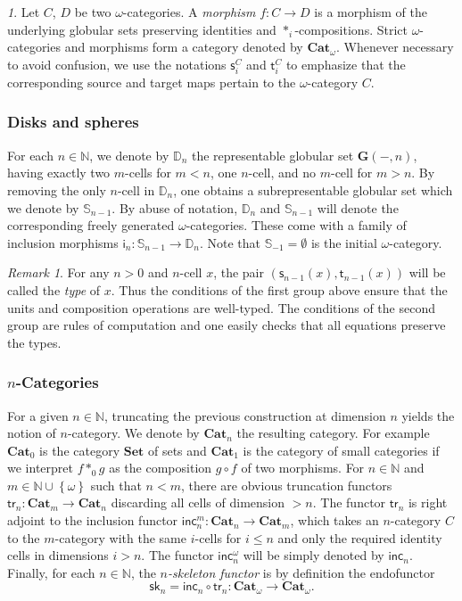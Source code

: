 \documentclass[reqno]{amsart}
\theoremstyle{plain}
\theoremstyle{definition}
\theoremstyle{remark}
\newtheorem{remark}[subsubsection]{Remark}
\newtheorem{paragr}[subsubsection]{} %
\newcommand{\nmbr}[1]{\mathbb #1}
\newcommand{\N}{\nmbr{N}}
\newcommand{\set}[1]{\left\{#1\right\}}
\newcommand{\pair}[2]{(#1,#2)}       %
\newcommand{\source}{\mathsf{s}} %
\newcommand{\target}{\mathsf{t}} %
\newcommand{\homset}[3]{#1(#2,#3)} %
\newcommand{\ctg}[1]{\mathbf{#1}}  %
\newcommand{\Set}{\ctg{Set}}    %
\newcommand{\Cat}{\ctg{Cat}}   %
\newcommand{\nCat}[1]{\Cat_{#1}}  %
\newcommand{\oCat}{\nCat{\omega}} %
\newcommand{\glob}{\ctg{G}}%
\newcommand{\functor}[1]{\mathsf{#1}} %
\newcommand{\trk}[1]{\functor{tr}_{#1}}%
\newcommand{\inc}[2]{\functor{inc}_{#1}^{#2}}%
\newcommand{\oinc}[1]{\inc{#1}{}}%
\newcommand{\skl}[1]{\functor{sk}_{#1}}%
\newcommand{\comp}[1]{\ast_{#1}} %
\newcommand{\sce}[1]{\source_{#1}} %
\newcommand{\tge}[1]{\target_{#1}} %
\newcommand{\oo}{\ensuremath{\omega}}
\newcommand{\Sph}[1]{\mathbb{S}_{#1}} %
\newcommand{\Dsk}[1]{\mathbb{D}_{#1}} %
\newcommand{\gcof}[1]{\functor{i}_{#1}} %
\begin{document}
\begin{paragr}
  Let $C$, $D$ be two \oo-categories. A {\em morphism} $f:C\to D$ is a
morphism of the underlying globular sets preserving identities and
$\comp i$-compositions. Strict \oo-categories and morphisms form a
category denoted by $\oCat$. Whenever necessary to avoid confusion, we use the notations $\sce i^C$ and
$\tge i^C$ to
emphasize that the corresponding source and target maps pertain to the
\oo-category $C$.
\end{paragr}


\subsubsection{Disks and spheres}\label{ssubsec:disks}
For each $n\in\N$, we denote by $\Dsk n$ the representable globular
set $\homset{\glob}{-}{n}$, having exactly two $m$-cells for $m<n$, one
$n$-cell, and no $m$-cell for $m>n$. By removing the only $n$-cell in
$\Dsk n$, one obtains a subrepresentable globular set which we denote by $\Sph{n-1}$. 
By abuse of notation, $\Dsk n$ and $\Sph{n-1}$ will
denote the corresponding freely generated  \oo-categories. These come
with a family of inclusion morphisms $\gcof n:\Sph{n-1}\to\Dsk
n$. Note that $\Sph{-1}=\emptyset$ is the initial \oo-category.
\begin{remark}
  For any $n>0$ and $n$-cell $x$, the pair $\pair{\sce{n-1}(x)}{\tge{n-1}(x)}$ will be called the {\em type} of $x$. Thus the conditions of the first group above ensure that the units and composition operations are well-typed. The conditions of the second group are rules of computation and one easily checks that all equations preserve the types. 
\end{remark}
\subsubsection{\texorpdfstring{$n$}{n}-Categories}\label{ssubsec:ncat}
For a given $n\in\N$, truncating the previous construction at dimension $n$ yields the notion of $n$-category.  We denote by $\nCat n$ the resulting category. For example $\nCat 0$ is the category $\Set$ of sets and $\nCat 1$ is the category of small categories if we interpret $f\comp 0 g$ as the composition $g\circ f$ of two morphisms.
For $n\in\N$ and $m\in\N\cup \set{\oo}$ such that $n<m$, there are 
obvious truncation functors $\trk n:\nCat m\to \nCat n$ discarding all
cells of dimension $>n$. The functor $\trk n$ is right adjoint to the
inclusion functor  $\inc nm:\nCat n\to\nCat m$, which takes an
$n$-category $C$ to the $m$-category with the same $i$-cells for
$i\leq n$ and only the required identity cells in dimensions
$i>n$. The functor $\inc n{\oo}$ will be simply denoted by $\oinc
n$. Finally, for each $n\in\N$, the {\em $n$-skeleton functor} is by
definition the endofunctor 
\[
  \skl n=\oinc n\circ\trk n:\oCat\to \oCat.
  \]
\end{document}

